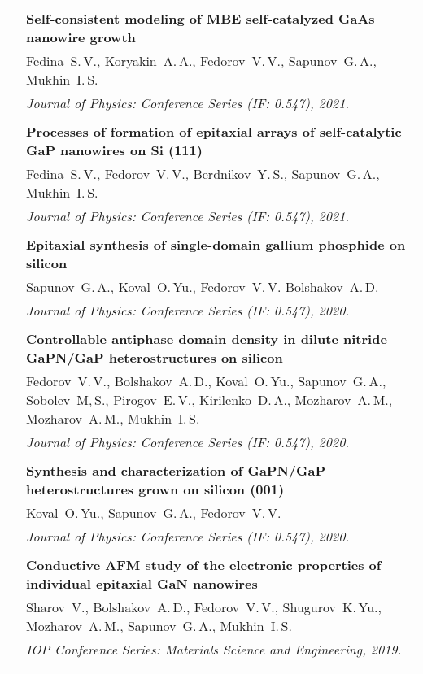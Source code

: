 \documentclass[letterpaper, 11pt]{article}
\begin{document}
\begin{longtable}{p{1.3in}p{4.8in}}
        & \textbf{Self-consistent modeling of MBE self-catalyzed GaAs nanowire
        growth} \\
        & Fedina~S.\,V., Koryakin~A.\,A., Fedorov~V.\,V., Sapunov~G.\,A.,
        Mukhin~I.\,S. \\
        & \textit{Journal of Physics: Conference Series (IF: 0.547), 2021.}\\
		& \\

        & \textbf{Processes of formation of epitaxial arrays of self-catalytic
        GaP nanowires on Si (111)} \\
        & Fedina~S.\,V., Fedorov~V.\,V., Berdnikov~Y.\,S., Sapunov~G.\,A.,
        Mukhin~I.\,S. \\
        & \textit{Journal of Physics: Conference Series (IF: 0.547), 2021.}\\
		& \\
		
        & \textbf{Epitaxial synthesis of single-domain gallium phosphide on
        silicon} \\
        & Sapunov~G.\,A., Koval~O.\,Yu., Fedorov~V.\,V. Bolshakov~A.\,D. \\
        & \textit{Journal of Physics: Conference Series (IF: 0.547), 2020.}\\
		& \\
		
        & \textbf{Controllable antiphase domain density in dilute nitride
        GaPN/GaP heterostructures on silicon} \\
        & Fedorov~V.\,V., Bolshakov~A.\,D., Koval~O.\,Yu., Sapunov~G.\,A.,
        Sobolev~M,\,S., Pirogov~E.\,V., Kirilenko~D.\,A., Mozharov~A.\,M.,
        Mozharov~A.\,M., Mukhin~I.\,S. \\
        & \textit{Journal of Physics: Conference Series (IF: 0.547), 2020.}\\
		& \\
		
        & \textbf{Synthesis and characterization of GaPN/GaP heterostructures
        grown on silicon (001)} \\
        & Koval~O.\,Yu., Sapunov~G.\,A., Fedorov~V.\,V. \\
        & \textit{Journal of Physics: Conference Series (IF: 0.547), 2020.}\\
		& \\
		
        & \textbf{Conductive AFM study of the electronic properties of
        individual epitaxial GaN nanowires} \\
        & Sharov~V., Bolshakov~A.\,D., Fedorov~V.\,V., Shugurov~K.\,Yu.,
        Mozharov~A.\,M., Sapunov~G.\,A., Mukhin~I.\,S. \\
		& \textit{IOP Conference Series: Materials Science and Engineering, 2019.}\\
		& \\
		

\end{longtable}
\end{document}
